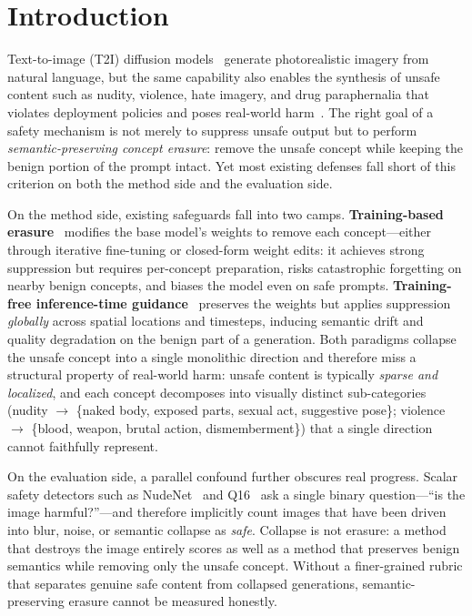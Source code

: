 
\section{Introduction}

Text-to-image (T2I) diffusion models~\citep{rombach2022high,ramesh2022hierarchical} generate photorealistic imagery from natural language, but the same capability also enables the synthesis of unsafe content such as nudity, violence, hate imagery, and drug paraphernalia that violates deployment policies and poses real-world harm~\citep{rando2022red,schramowski2023safe,qu2023unsafe}. The right goal of a safety mechanism is not merely to suppress unsafe output but to perform \emph{semantic-preserving concept erasure}: remove the unsafe concept while keeping the benign portion of the prompt intact. Yet most existing defenses fall short of this criterion on both the method side and the evaluation side.

On the method side, existing safeguards fall into two camps. \textbf{Training-based erasure}~\citep{gandikota2023erasing,kim2023towards,gandikota2024unified,gong2024reliable} modifies the base model's weights to remove each concept---either through iterative fine-tuning or closed-form weight edits: it achieves strong suppression but requires per-concept preparation, risks catastrophic forgetting on nearby benign concepts, and biases the model even on safe prompts. \textbf{Training-free inference-time guidance}~\citep{schramowski2023safe,brack2023sega,yoon2024safree} preserves the weights but applies suppression \emph{globally} across spatial locations and timesteps, inducing semantic drift and quality degradation on the benign part of a generation. Both paradigms collapse the unsafe concept into a single monolithic direction and therefore miss a structural property of real-world harm: unsafe content is typically \emph{sparse and localized}, and each concept decomposes into visually distinct sub-categories (nudity $\to$ \{naked body, exposed parts, sexual act, suggestive pose\}; violence $\to$ \{blood, weapon, brutal action, dismemberment\}) that a single direction cannot faithfully represent.

On the evaluation side, a parallel confound further obscures real progress. Scalar safety detectors such as NudeNet~\citep{notai_nudenet_2019} and Q16~\citep{schramowski2022can} ask a single binary question---``is the image harmful?''---and therefore implicitly count images that have been driven into blur, noise, or semantic collapse as \emph{safe}. Collapse is not erasure: a method that destroys the image entirely scores as well as a method that preserves benign semantics while removing only the unsafe concept. Without a finer-grained rubric that separates genuine safe content from collapsed generations, semantic-preserving erasure cannot be measured honestly.

